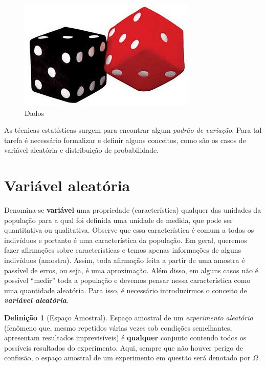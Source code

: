 \documentclass[
]{book}
\theoremstyle{definition}
\newtheorem{definition}{Definição}[chapter]
\theoremstyle{definition}
\theoremstyle{definition}
\theoremstyle{remark}
\begin{document}
\begin{figure}

{\centering \includegraphics[width=0.33\linewidth]{Figuras/dados-vp} 

}

\caption{Dados}\label{fig:dados}
\end{figure}

As técnicas estatísticas surgem para encontrar algum \emph{padrão de variação}. Para tal tarefa é necessário formalizar e definir alguns conceitos, como são os casos de variável aleatória e distribuição de probabilidade.

\hypertarget{variuxe1vel-aleatuxf3ria}{%
\section{Variável aleatória}\label{variuxe1vel-aleatuxf3ria}}

Denomina-se \textbf{variável} uma propriedade (característica) qualquer das unidades da população para a qual foi definida uma unidade de medida, que pode ser quantitativa ou qualitativa. Observe que essa característica é comum a todos os indivíduos e portanto é uma característica da população. Em geral, queremos fazer afirmações sobre características e temos apenas informações de alguns indivíduos (amostra). Assim, toda afirmação feita a partir de uma amostra é passível de erros, ou seja, é uma
aproximação. Além disso, em alguns casos não é possível ``medir'' toda a população e devemos pensar nessa característica como uma quantidade aleatória. Para isso, é necessário introduzirmos o
conceito de \emph{\textbf{variável aleatória}}.

\begin{definition}[Espaço Amostral]
\protect\hypertarget{def:EspacoAmostral}{}{\label{def:EspacoAmostral} {} }Espaço amostral de um \emph{experimento aleatório} (fenômeno que, mesmo repetidos várias vezes sob condições semelhantes, apresentam resultados imprevisíveis) é \textbf{qualquer} conjunto contendo todos os possíveis resultados do experimento. Aqui, sempre que não houver perigo de confusão, o espaço amostral de um experimento em questão será denotado por \(\Omega\).
\end{definition}
\end{document}
